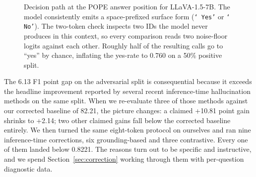 \documentclass[11pt,letterpaper]{article}
\begin{document}
\begin{figure}[t]
\caption{Decision path at the POPE answer position for LLaVA-1.5-7B.
The model consistently emits a space-prefixed surface form
(\texttt{`\,Yes'} or \texttt{`\,No'}). The two-token check inspects two
IDs the model never produces in this context, so every comparison reads
two noise-floor logits against each other. Roughly half of the resulting
calls go to ``yes'' by chance, inflating the yes-rate to 0.760 on a 50\%
positive split.}
\label{fig:pipeline}
\end{figure}

The 6.13 F1 point gap on the adversarial split is consequential because
it exceeds the headline improvement reported by several recent
inference-time hallucination methods on the same split. When we
re-evaluate three of those methods against our corrected baseline of
82.21, the picture changes: a claimed +10.81 point gain shrinks to
+2.14; two other claimed gains fall below the corrected baseline
entirely. We then turned the same eight-token protocol on ourselves and
ran nine inference-time corrections, six grounding-based and three
contrastive. Every one of them landed below 0.8221. The reasons turn
out to be specific and instructive, and we spend Section~\ref{sec:correction}
working through them with per-question diagnostic data.
\end{document}

